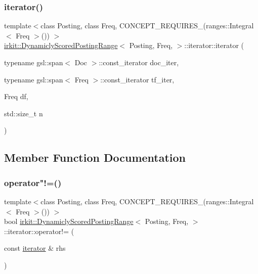 \subsubsection{\texorpdfstring{iterator()}{iterator()}}
{\footnotesize\ttfamily template$<$class Posting, class Freq, C\+O\+N\+C\+E\+P\+T\+\_\+\+R\+E\+Q\+U\+I\+R\+E\+S\+\_\+(ranges\+::\+Integral$<$ Freq $>$()) $>$ \\
\hyperlink{classirkit_1_1DynamiclyScoredPostingRange}{irkit\+::\+Dynamicly\+Scored\+Posting\+Range}$<$ Posting, Freq, $>$\+::iterator\+::iterator (\begin{DoxyParamCaption}\item[{typename gsl\+::span$<$ Doc $>$\+::const\+\_\+iterator}]{doc\+\_\+iter,  }\item[{typename gsl\+::span$<$ Freq $>$\+::const\+\_\+iterator}]{tf\+\_\+iter,  }\item[{Freq}]{df,  }\item[{std\+::size\+\_\+t}]{n }\end{DoxyParamCaption})\hspace{0.3cm}{\ttfamily [inline]}}



\subsection{Member Function Documentation}
\mbox{\label{classirkit_1_1DynamiclyScoredPostingRange_1_1iterator_afe8fa01fe3f45c67c02824462ba4d657}} 
\subsubsection{\texorpdfstring{operator"!=()}{operator!=()}}
{\footnotesize\ttfamily template$<$class Posting, class Freq, C\+O\+N\+C\+E\+P\+T\+\_\+\+R\+E\+Q\+U\+I\+R\+E\+S\+\_\+(ranges\+::\+Integral$<$ Freq $>$()) $>$ \\
bool \hyperlink{classirkit_1_1DynamiclyScoredPostingRange}{irkit\+::\+Dynamicly\+Scored\+Posting\+Range}$<$ Posting, Freq, $>$\+::iterator\+::operator!= (\begin{DoxyParamCaption}\item[{const \hyperlink{classirkit_1_1DynamiclyScoredPostingRange_1_1iterator}{iterator} \&}]{rhs }\end{DoxyParamCaption})\hspace{0.3cm}{\ttfamily [inline]}}

